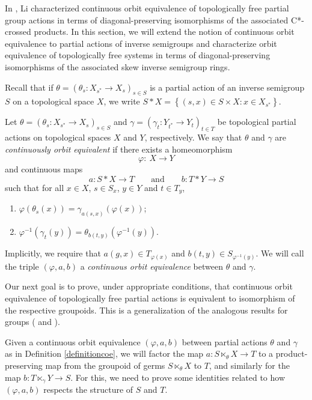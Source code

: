 In \cite{MR3694599}, Li characterized continuous orbit equivalence of topologically free partial group actions in terms of diagonal-preserving isomorphisms of the associated C*-crossed products. In this section, we will extend the notion of continuous orbit equivalence to partial actions of inverse semigroups and characterize orbit equivalence of topologically free systems in terms of diagonal-preserving isomorphisms of the associated skew inverse semigroup rings.

Recall that if $\theta=\left(\theta_s:X_{s^*}\to X_s\right)_{s\in S}$ is a partial action of an inverse semigroup $S$ on a topological space $X$, we write $S\ast X=\left\{(s,x)\in S\times X:x\in X_{s^*}\right\}$.

\begin{definition}\label{definitioncoe}
Let $\theta=\left(\theta_s:X_{s^*}\to X_s\right)_{s\in S}$ and  $\gamma=\left(\gamma_t:Y_{t^*}\to Y_t\right)_{t\in T}$ be topological partial actions on topological spaces $X$ and $Y$, respectively. We say that $\theta$ and $\gamma$ are \emph{continuously orbit equivalent} if there exists a homeomorphism 
\[\varphi: \: X \longrightarrow Y\]
and continuous maps
\[a: S\ast X \longrightarrow T\qquad\text{and}\qquad b: T\ast Y \longrightarrow S\]
such that for all $x\in X$, $s\in S_x$, $y\in Y$ and $t\in T_y$,
\begin{enumerate}%
\item[(i)] $\varphi(\theta_s(x)) = \gamma_{a(s,x)}(\varphi(x))$;
\item[(ii)] $\varphi^{-1}(\gamma_t(y)) = \theta_{b(t,y)}(\varphi^{-1}(y))$.
\end{enumerate}
Implicitly, we require that $a(g,x) \in T_{\varphi(x)}$ and $b(t,y) \in S_{\varphi^{-1}(y)}$. We will call the triple $(\varphi,a,b)$ a \emph{continuous orbit equivalence} between $\theta$ and $\gamma$.
\end{definition}


Our next goal is to prove, under appropriate conditions, that continuous orbit equivalence of topologically free partial actions is equivalent to isomorphism of the respective groupoids. This is a generalization of the analogous results for groups (\cite[Theorem 1.2]{MR3789176} and \cite[Theorem 2.7]{MR3694599}).

Given a continuous orbit equivalence $(\varphi,a,b)$ between partial actions $\theta$ and $\gamma$ as in Definition \ref{definitioncoe}, we will factor the map $a:S\ltimes_\theta X\to T$ to a product-preserving map from the groupoid of germs $S\ltimes_\theta X$ to $T$, and similarly for the map $b:T\ltimes_\gamma Y\to S$. For this, we need to prove some identities related to how $(\varphi,a,b)$ respects the structure of $S$ and $T$.

